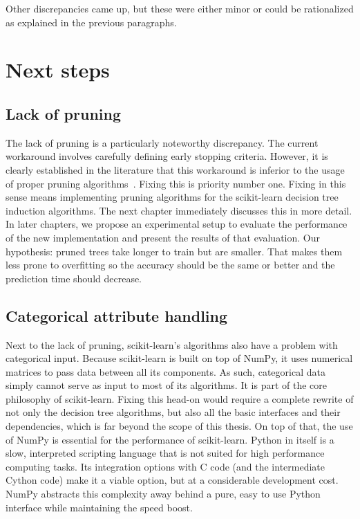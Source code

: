 Other discrepancies came up, but these were either minor or could be rationalized as explained in the previous paragraphs.

\section{Next steps}

\subsection{Lack of pruning}
The lack of pruning is a particularly noteworthy discrepancy. The current workaround involves carefully defining early stopping criteria. However, it is clearly established in the literature that this workaround is inferior to the usage of proper pruning algorithms~\cite{cart, c45}. Fixing this is priority number one. Fixing in this sense means implementing pruning algorithms for the scikit-learn decision tree induction algorithms. The next chapter immediately discusses this in more detail. In later chapters, we propose an experimental setup to evaluate the performance of the new implementation and present the results of that evaluation. Our hypothesis: pruned trees take longer to train but are smaller. That makes them less prone to overfitting so the accuracy should be the same or better and the prediction time should decrease.

\subsection{Categorical attribute handling}\label{ssec:cat_attr_handling}
Next to the lack of pruning, scikit-learn's algorithms also have a problem with categorical input. Because scikit-learn is built on top of NumPy, it uses numerical matrices to pass data between all its components. As such, categorical data simply cannot serve as input to most of its algorithms. It is part of the core philosophy of scikit-learn. Fixing this head-on would require a complete rewrite of not only the decision tree algorithms, but also all the basic interfaces and their dependencies, which is far beyond the scope of this thesis. On top of that, the use of NumPy is essential for the performance of scikit-learn. Python in itself is a slow, interpreted scripting language that is not suited for high performance computing tasks. Its integration options with C code (and the intermediate Cython code) make it a viable option, but at a considerable development cost. NumPy abstracts this complexity away behind a pure, easy to use Python interface while maintaining the speed boost.

